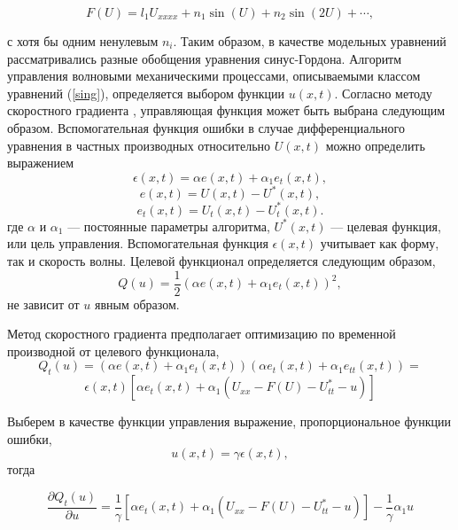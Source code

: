 \begin{equation}
F\left(U\right) = l_1 U_{xxxx} + n_1 \sin (U) + n_2 \sin(2 U) + \cdots,	\label{FUsin}
\end{equation}

с хотя бы одним ненулевым $n_i$. Таким образом, в качестве модельных уравнений рассматривались разные обобщения уравнения синус-Гордона. Алгоритм управления волновыми механическими процессами, описываемыми классом уравнений (\ref{sing}), определяется выбором функции $u(x,t)$. Согласно методу скоростного градиента \cite{fradkov_rus_speed_grad}, управляющая функция может быть выбрана следующим образом. Вспомогательная функция ошибки в случае дифференциального уравнения в частных производных относительно $U(x,t)$ можно определить выражением
$$
\epsilon(x,t)=\alpha e(x,t)+\alpha_1 e_t(x,t),
$$
$$
e(x,t)=U(x,t)-U^*(x,t),
$$
$$
e_t(x,t)=U_t(x,t)-U^*_t(x,t).
$$
где $\alpha$ и $\alpha_1$ --- постоянные параметры алгоритма, $U^*(x,t)$ --- целевая функция, или цель управления. Вспомогательная функция $\epsilon(x,t)$ учитывает как форму, так и скорость волны. Целевой функционал определяется следующим образом,
\begin{equation}
	Q(u)=\frac{1}{2}(\alpha e(x,t) + \alpha_1 e_t(x,t))^2,
\end{equation}
не зависит от $u$ явным образом.


Метод скоростного градиента предполагает оптимизацию по временной производной от целевого функционала,
$$
Q_t(u) = (\alpha e(x,t) + \alpha_1 e_t(x,t))(\alpha e_t(x,t) + \alpha_1 e_{tt}(x,t)) =
$$
\begin{equation}
	 \epsilon(x,t)\left[\alpha e_t(x,t) + \alpha_1 (U_{xx}-F\left(U\right)-U^*_{tt}-u)\right]
\end{equation}

Выберем в качестве функции управления выражение, пропорциональное функции ошибки,
\begin{equation}
	u(x,t)=\gamma \epsilon(x,t),
	\label{contrP}
\end{equation}
тогда

$$
	\frac{\partial Q_t(u)}{\partial u} = \frac{1}{\gamma} \left[\alpha e_t(x,t) + \alpha_1 (U_{xx}-F\left(U\right)-U^*_{tt} - u)\right] - \frac{1}{\gamma} \alpha_1 u
$$

